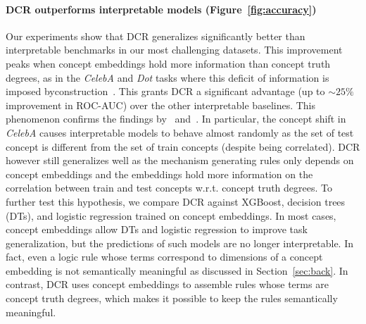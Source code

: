 \paragraph{DCR outperforms interpretable models (Figure~\ref{fig:accuracy})} 
Our experiments show that DCR generalizes significantly better than interpretable benchmarks in our most challenging datasets. This improvement peaks when concept embeddings hold more information than concept truth degrees, as in  the \emph{CelebA} and \emph{Dot} tasks where this deficit of information is imposed byconstruction~\cite{zarlenga2022concept}. This grants DCR a significant advantage (up to $\sim 25\%$ improvement in ROC-AUC) over the other interpretable baselines. This phenomenon confirms the findings by~\citet{mahinpei2021promises} and~\citet{zarlenga2023towards}. In particular, the concept shift in \emph{CelebA} causes interpretable models to behave almost randomly as the set of test concept is different from the set of train concepts (despite being correlated). DCR however still generalizes well as the mechanism generating rules only depends on concept embeddings and the embeddings hold more information on the correlation between train and test concepts w.r.t. concept truth degrees.
To further test this hypothesis, we compare DCR against XGBoost, decision trees (DTs), and logistic regression trained on concept embeddings. In most cases, concept embeddings allow DTs and logistic regression to improve task generalization, but the predictions of such models are no longer interpretable. In fact, even a logic rule whose terms correspond to dimensions of a concept embedding is not semantically meaningful as discussed in Section~\ref{sec:back}. In contrast, DCR uses concept embeddings to assemble rules whose terms are concept truth degrees, which makes it possible to keep the rules semantically meaningful.

